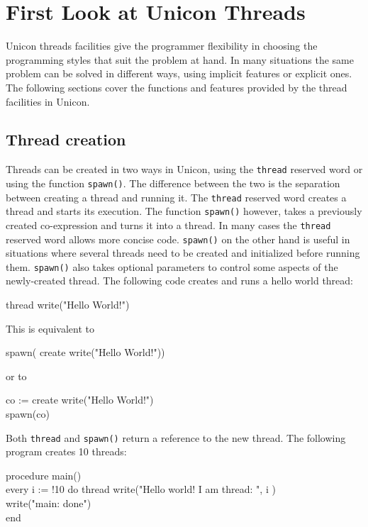 \section{First Look at Unicon Threads}

Unicon threads facilities give the programmer flexibility in choosing
the programming styles that suit the problem at hand. In many
situations the same problem can be solved in different ways, using
implicit features or explicit ones. The following sections cover the
functions and features provided by the thread facilities in Unicon.

\subsection{Thread creation}

Threads can be created in two ways in Unicon, using the
\texttt{thread} reserved word or using the function
\texttt{spawn()}. The difference between the two is the separation
between creating a thread and running it. The \texttt{thread} reserved
word creates a thread and starts its execution. The function
\texttt{spawn()} however, takes a previously created co-expression and
turns it into a thread.  In many cases the \texttt{thread} reserved
word allows more concise code. \texttt{spawn()} on the other hand is
useful in situations where several threads need to be created and
initialized before running them.  \texttt{spawn()} also takes optional
parameters to control some aspects of the newly-created thread. The
following code creates and runs a hello world thread:

\begin{icode}
thread write("Hello World!")
\end{icode}

\noindent This is equivalent to
\begin{icode}
spawn( create write("Hello World!"))
\end{icode}
or to
\begin{icode}
co := create write("Hello World!") \\
spawn(co)
\end{icode}
Both \texttt{thread} and \texttt{spawn()} return a reference to the
new thread. The following program creates 10 threads: 
\begin{icode}
procedure main() \\
\> every i := !10 do thread write("Hello world! I am thread: ", i ) \\
\> write("main: done") \\
end
\end{icode}

